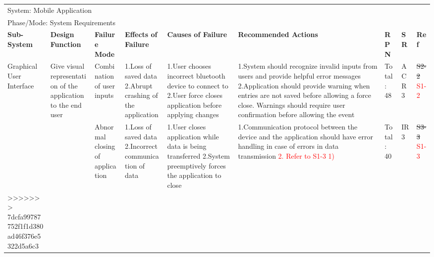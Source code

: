 \documentclass[12pt, titlepage]{article}
\begin{document}
\begin{landscape}
\begin{table}[H]
\begin{tabular}{| p{} | p{}  | p{} | p{} | p{} | p{} | p{} | p{} | p{} |}
    \multicolumn{9}{|l|}{System: Mobile Application } \\
    \multicolumn{9}{|l|}{Phase/Mode: System Requirements} \\ \hline
    \textbf{Sub-System} & \textbf{Design Function} & \textbf{Failure Mode} & \textbf{Effects of Failure} & \textbf{Causes of Failure} & \textbf{Recommended Actions} & \textbf{RPN} & \textbf{SR} & \textbf{Ref} \\ \hline

    Graphical User Interface & Give visual representation of the application to the end user & Combination of user inputs & 1.Loss of saved data \newline 2.Abrupt crashing of the application  &  1.User chooses incorrect bluetooth device to connect to \newline 2.User force closes application before applying changes  &  1.System should recognize invalid inputs from users and provide helpful error messages \newline 2.Application should provide warning when entries are not saved before allowing a force close. Warnings should require user confirmation before allowing the event  & Total: 48 & ACR3 & \sout{S2-2} \textcolor{red}{S1-2} \\ \cline{3-9}

     & & Abnormal closing of application & 1.Loss of saved data \newline 2.Incorrect communication of data  & 1.User closes application while data is being transferred \newline 2.System preemptively forces the application to close & 1.Communication protocol between the device and the application should have error handling in case of errors in data transmission \newline \textcolor{red}{2. Refer to S1-3 1)}  & Total: 40 & IR3 & \sout{S3-3} \textcolor{red}{S1-3} \\ \hline
>>>>>>> 7dcfa99787752f1f1d380ad46f376e5322d5a6c3
    

\end{tabular}
\end{table}
\end{landscape}
\end{document}
